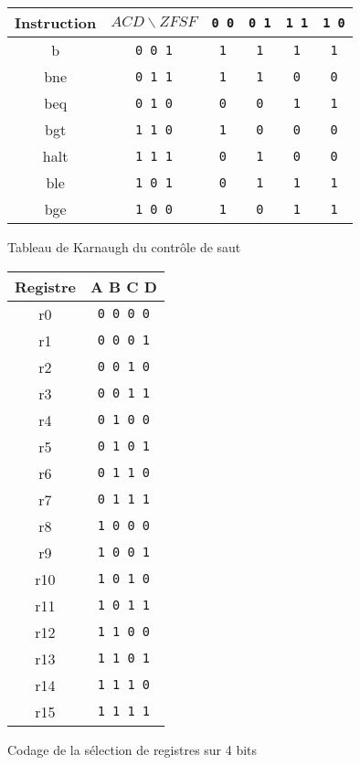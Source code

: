 \documentclass[10pt,a4paper]{article}
\begin{document}
\begin{figure}[h]
\centering
\begin{tabular}{|c|c|c|c|c|c|}
 \hline
 \textbf{Instruction} & \textbf{$A C D \backslash ZF SF$} & \verb|0 0| & \verb|0 1| & \verb|1 1| & \verb|1 0|\\
 \hline
  b & \verb|0 0 1| & \verb|1| & \verb|1| & \verb|1| & \verb|1| \\
 \hline
   bne & \verb|0 1 1| & \verb|1| & \verb|1| & \verb|0| & \verb|0| \\
 \hline
   beq & \verb|0 1 0| & \verb|0| & \verb|0| & \verb|1| & \verb|1| \\
 \hline
   bgt & \verb|1 1 0| & \verb|1| & \verb|0| & \verb|0| & \verb|0| \\
 \hline
   halt & \verb|1 1 1| & \verb|0| & \verb|1| & \verb|0| & \verb|0| \\
 \hline
   ble & \verb|1 0 1| & \verb|0| & \verb|1| & \verb|1| & \verb|1| \\
 \hline
   bge & \verb|1 0 0| & \verb|1| & \verb|0| & \verb|1| & \verb|1| \\
 \hline
\end{tabular}
\caption{Tableau de Karnaugh du contrôle de saut}
\label{karnaugh_controle}
\end{figure}

\begin{figure}[h]
\centering
\begin{tabular}{|c|c|}
 \hline
 \textbf{Registre} & \textbf{A B C D} \\
 \hline
 r0 & \verb|0 0 0 0| \\
 \hline
 r1 & \verb|0 0 0 1| \\
 \hline
 r2 & \verb|0 0 1 0| \\
 \hline
 r3 & \verb|0 0 1 1| \\
 \hline
 r4 & \verb|0 1 0 0| \\
 \hline
 r5 & \verb|0 1 0 1| \\
 \hline
 r6 & \verb|0 1 1 0| \\
 \hline
 r7 & \verb|0 1 1 1| \\
 \hline
 r8 & \verb|1 0 0 0| \\
 \hline
 r9 & \verb|1 0 0 1| \\
 \hline
 r10 & \verb|1 0 1 0| \\
 \hline
 r11 & \verb|1 0 1 1| \\
 \hline
 r12 & \verb|1 1 0 0| \\
 \hline
 r13 & \verb|1 1 0 1| \\
 \hline
 r14 & \verb|1 1 1 0| \\
 \hline
 r15 & \verb|1 1 1 1| \\
 \hline
\end{tabular}
\caption{Codage de la sélection de registres sur 4 bits}
\label{code_registres}
\end{figure}
\end{document}
